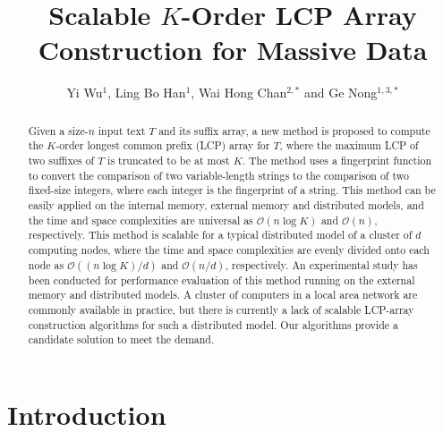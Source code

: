 \documentclass{llncs}
\begin{document}
\title{Scalable $K$-Order LCP Array Construction for Massive Data}

\author{Yi Wu$^1$, Ling Bo Han$^1$, Wai Hong Chan$^{2,*}$ and Ge Nong$^{1,3,*}$}


\maketitle

\begin{abstract}
Given a size-$n$ input text $T$ and its suffix array, a new method is proposed to compute the $K$-order longest common prefix (LCP) array for $T$, where the maximum LCP of two suffixes of $T$ is truncated to be at most $K$. The method uses a fingerprint function to convert the comparison of two variable-length strings to the comparison of two fixed-size integers, where each integer is the fingerprint of a string. This method can be easily applied on the internal memory, external memory and distributed models, and the time and space complexities are universal as $\mathcal{O}(n\log K)$ and $\mathcal{O}(n)$, respectively. This method is scalable for a typical distributed model of a cluster of $d$ computing nodes, where the time and space complexities are evenly divided onto each node as $\mathcal{O}((n\log K)/d)$ and $\mathcal{O}(n/d)$, respectively. An experimental study has been conducted for performance evaluation of this method running on the external memory and distributed models. A cluster of computers in a local area network are commonly available in practice, but there is currently a lack of scalable LCP-array construction algorithms for such a distributed model. Our algorithms provide a candidate solution to meet the demand.
\end{abstract}

\section{Introduction}
\end{document}
